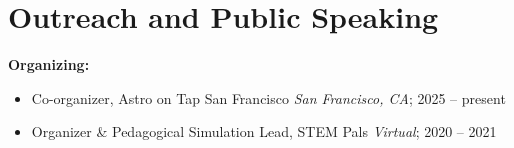\section{Outreach and Public Speaking}

\textbf{Organizing:}
\begin{itemize}
    \item Co-organizer, Astro on Tap San Francisco \hfill \textit{San Francisco, CA}; 2025 -- present

    \item Organizer \& Pedagogical Simulation Lead, STEM Pals \hfill \textit{Virtual}; 2020 -- 2021

\end{itemize}

